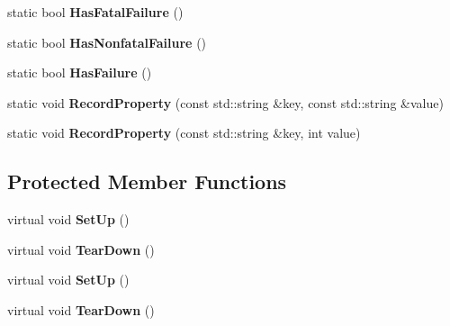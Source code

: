 \begin{DoxyCompactItemize}
\item 
\hypertarget{classtesting_1_1_test_a0a89846458f0e8ed1c9457c957e8182a}{}static bool {\bfseries Has\+Fatal\+Failure} ()\label{classtesting_1_1_test_a0a89846458f0e8ed1c9457c957e8182a}

\item 
\hypertarget{classtesting_1_1_test_a07e896f1b1836f8ac075c26d7b7c9fb8}{}static bool {\bfseries Has\+Nonfatal\+Failure} ()\label{classtesting_1_1_test_a07e896f1b1836f8ac075c26d7b7c9fb8}

\item 
\hypertarget{classtesting_1_1_test_a7a00be7dd0a6bfdc8d47a1b784623613}{}static bool {\bfseries Has\+Failure} ()\label{classtesting_1_1_test_a7a00be7dd0a6bfdc8d47a1b784623613}

\item 
\hypertarget{classtesting_1_1_test_ae0448aec9e389fab70f6a75a59ff6aa2}{}static void {\bfseries Record\+Property} (const std\+::string \&key, const std\+::string \&value)\label{classtesting_1_1_test_ae0448aec9e389fab70f6a75a59ff6aa2}

\item 
\hypertarget{classtesting_1_1_test_af602903efb17730b977304fc56500881}{}static void {\bfseries Record\+Property} (const std\+::string \&key, int value)\label{classtesting_1_1_test_af602903efb17730b977304fc56500881}

\end{DoxyCompactItemize}
\subsection*{Protected Member Functions}
\begin{DoxyCompactItemize}
\item 
\hypertarget{classtesting_1_1_test_a8b38992669fb844864807cf32e416853}{}virtual void {\bfseries Set\+Up} ()\label{classtesting_1_1_test_a8b38992669fb844864807cf32e416853}

\item 
\hypertarget{classtesting_1_1_test_aab3c02c9f81afe1357adfc45afccd474}{}virtual void {\bfseries Tear\+Down} ()\label{classtesting_1_1_test_aab3c02c9f81afe1357adfc45afccd474}

\item 
\hypertarget{classtesting_1_1_test_a8b38992669fb844864807cf32e416853}{}virtual void {\bfseries Set\+Up} ()\label{classtesting_1_1_test_a8b38992669fb844864807cf32e416853}

\item 
\hypertarget{classtesting_1_1_test_aab3c02c9f81afe1357adfc45afccd474}{}virtual void {\bfseries Tear\+Down} ()\label{classtesting_1_1_test_aab3c02c9f81afe1357adfc45afccd474}

\end{DoxyCompactItemize}
